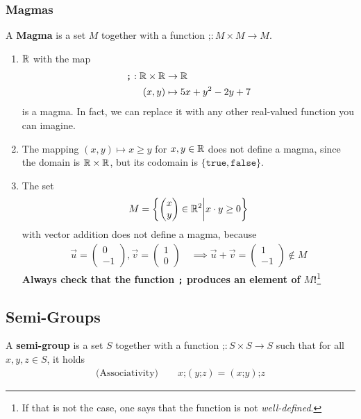 \subsubsection{Magmas}
A \textbf{Magma} is a set $M$ together with a function $\texttt{;}: M \times M \to M$.
\begin{enumerate}
  \item $\mathbb{R}$ with the map
    \begin{align*}
      \texttt{;}: \mathbb{R} \times \mathbb{R} 
      &\to \mathbb{R}
      \\
      (x,y)
      &\mapsto
      5x + y^{2} - 2y + 7
    \end{align*}
    is a magma. In fact, we can replace it with any other real-valued function you can imagine.
  \item The mapping $(x,y) \mapsto x \geq y$ for $x,y \in \mathbb{R}$ does not define a magma, since the domain is $\mathbb{R} \times \mathbb{R}$, but its codomain is $\{\texttt{true},\texttt{false}\}$.
  \item The set
    \begin{align*}
      M = \left\{\begin{pmatrix}
      x\\
      y
      \end{pmatrix}\in \mathbb{R}^{2} \bigg\vert x \cdot y \geq 0\right\}
    \end{align*}
    with vector addition does not define a magma, because
    \begin{align*}
      \vec{u} = \begin{pmatrix}
      0\\
      -1
      \end{pmatrix}
      ,
      \vec{v} = \begin{pmatrix}
      1\\
      0
      \end{pmatrix}
      \quad
      \implies \vec{u} + \vec{v} = \begin{pmatrix}
      1\\
      -1
      \end{pmatrix}
      \notin M
    \end{align*}
    \textbf{Always check that the function \texttt{;} produces an element of $M$!}\footnote{If that is not the case, one says that the function is not \emph{well-defined}.}
\end{enumerate}

\subsection{Semi-Groups}
A \textbf{semi-group} is a set $S$ together with a function $\texttt{;}: S \times S \to S$ such that for all $x,y,z \in S$, it holds
\begin{align*}
  \text{(Associativity)} \qquad
  x \texttt{;} (y \texttt{;}z) = (x \texttt{;}y) \texttt{;}z
\end{align*}

